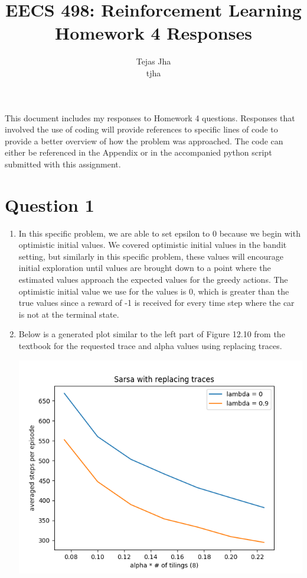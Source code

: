 \documentclass[11pt]{article}
\title{EECS 498: Reinforcement Learning \protect \\ Homework 4 Responses}
\author{Tejas Jha \\ tjha}
\begin{document}
\maketitle
This document includes my responses to Homework 4 questions. Responses that involved the use of coding will provide references to specific lines of code to provide a better overview of how the problem was approached. The code can either be referenced in the Appendix or in the accompanied python script submitted with this assignment.

\section*{Question 1}
\begin{enumerate}[label=(\alph*)]
\item
In this specific problem, we are able to set epsilon to 0 because we begin with optimistic initial values. We covered optimistic initial values in the bandit setting, but similarly in this specific problem, these values will encourage initial exploration until values are brought down to a point where the estimated values approach the expected values for the greedy actions. The optimistic initial value we use for the values is 0, which is greater than the true values since a reward of -1 is received for every time step where the car is not at the terminal state.

\item
Below is a generated plot similar to the left part of Figure 12.10 from the textbook for the requested trace and alpha values using replacing traces.

\includegraphics[scale=0.8]{replacing_traces.png}


\end{enumerate}
\end{document}
